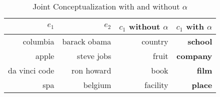 \begin{table}[htbp]
  \vspace{-6mm}
  \centering
  \caption{Joint Conceptualization with and without $\alpha$}
    \begin{tabular}{rrrr}
    \toprule
    $e_1$                               & $e_2$                               & $c_1 $  without $\alpha$       & $c_1$  with $\alpha$ \\
    \midrule
    columbia                            & barack obama                        & country                    & \textbf{school }\\
    apple                               & steve jobs                          & fruit                & \textbf{company} \\
   da vinci code           & ron howard                       & book                     & \textbf{film} \\
    spa                                 & belgium                             & facility                  & \textbf{place} \\
    \bottomrule
    \end{tabular}%
  \label{tab:expjc}%
  
  \vspace{-6mm}
\end{table}%



